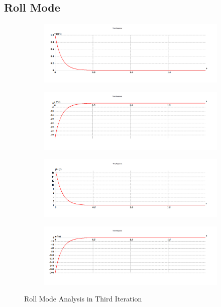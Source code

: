 \subsection{Roll Mode}
\begin{figure}[H]
\begin{subfigure}{0.48\textwidth}
\includegraphics[width = \linewidth]{v1.png}
\end{subfigure}
\begin{subfigure}{0.48\textwidth}
\includegraphics[width = \linewidth]{r1.png}
\end{subfigure}
\medskip
\begin{subfigure}{0.48\textwidth}
\includegraphics[width = \linewidth]{phi1.png}
\end{subfigure}
\begin{subfigure}{0.48\textwidth}
\includegraphics[width = \linewidth]{p1.png}
\end{subfigure}
\caption{Roll Mode Analysis in Third Iteration}
\end{figure}
